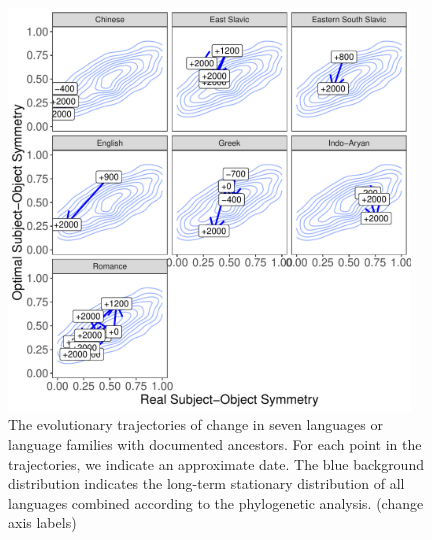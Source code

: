 \documentclass[11pt,a4paper]{article}
\newcommand\comment[1]{{\color{red}#1}}
\newcommand\mhahn[1]{{\color{red}(#1)}}
\begin{document}
\begin{figure}
    \centering
    \includegraphics[width=0.95\textwidth]{figures/historical_2.6_times_stationary.pdf}
    \caption{The evolutionary trajectories of change in seven languages or language families with documented ancestors. For each point in the trajectories, we indicate an approximate date. The blue background distribution indicates the long-term stationary distribution of all languages combined according to the phylogenetic analysis. \mhahn{change axis labels}}
    \label{fig:historical}
\end{figure}





\end{document}
